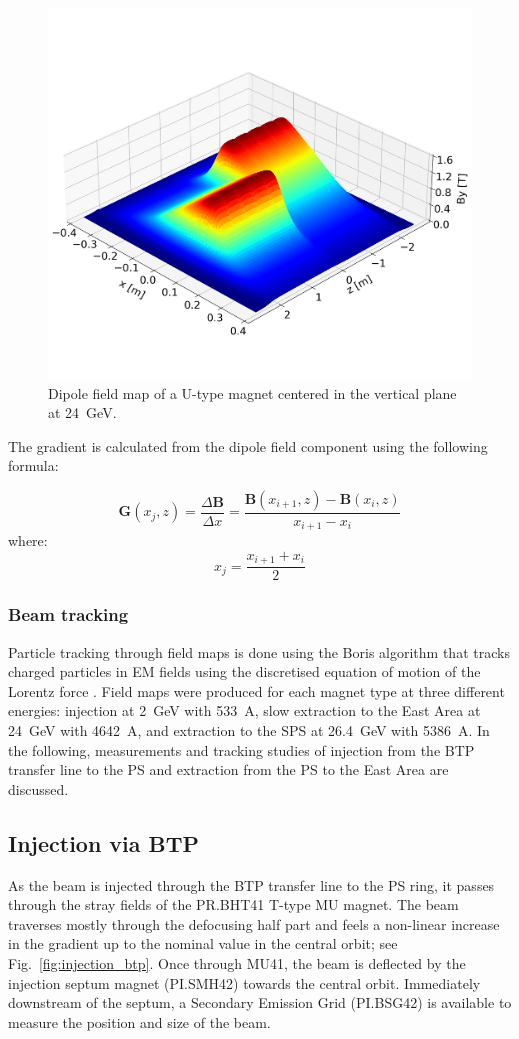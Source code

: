 \begin{figure}[!htb]
   \centering
   \includegraphics*[width=0.7\columnwidth, trim={0 2.9cm 0 4.3cm},clip]{01_Introduction/images/dipole_field.png}
   \caption{Dipole field map of a U-type magnet centered in the vertical plane at \SI{24}{GeV}.}
   \label{fig:dipole_field}
\end{figure}

The gradient is calculated from the dipole field component using the following formula:
 
$$ \boldsymbol{G}(x_{j},z) = \frac{\Delta\boldsymbol{B}}{\Delta x} = \frac{\boldsymbol{B}(x_{i+1},z) - \boldsymbol{B}(x_{i},z)}{x_{i+1}-x_{i}} $$
where:
$$ x_{j} = \frac{x_{i+1} + x_{i}}{{2}} $$

\subsubsection{Beam tracking}

Particle tracking through field maps is done using the Boris algorithm that tracks charged particles in EM fields using the discretised equation of motion of the Lorentz force \cite{dutheil_pybttrackersborispy_nodate,qin_why_2013,ripperda_comprehensive_2018}. Field maps were produced for each magnet type at three different energies: injection at \SI{2}{GeV} with \SI{533}{A}, slow extraction to the East Area at \SI{24}{GeV} with \SI{4642}{A}, and extraction to the SPS at \SI{26.4}{GeV} with \SI{5386}{A}. In the following, measurements and tracking studies of injection from the BTP transfer line to the PS and extraction from the PS to the East Area are discussed.

\subsection{Injection via BTP}
As the beam is injected through the BTP transfer line to the PS ring, it passes through the stray fields of the PR.BHT41 T-type MU magnet. The beam traverses mostly through the defocusing half part and feels a non-linear increase in the gradient up to the nominal value in the central orbit; see Fig.~\ref{fig:injection_btp}. Once through MU41, the beam is deflected by the injection septum magnet (PI.SMH42) towards the central orbit. Immediately downstream of the septum, a Secondary Emission Grid (PI.BSG42) is available to measure the position and size of the beam.

